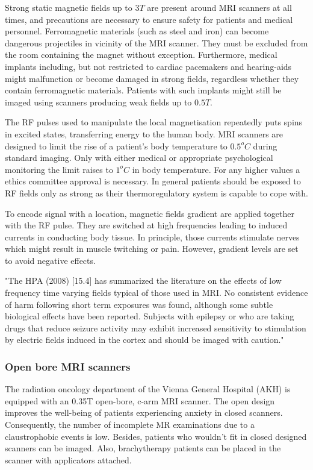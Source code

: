 Strong static magnetic fields up to $3T$ are present around MRI scanners at all times, and precautions are necessary to ensure safety for patients and medical personnel.
Ferromagnetic materials (such as steel and iron) can become dangerous projectiles in vicinity of the MRI scanner. They must be excluded from the room containing the magnet without exception.
Furthermore, medical implants including, but not restricted to cardiac pacemakers and hearing-aids might malfunction or become damaged in strong fields, regardless whether they contain ferromagnetic materials.
Patients with such implants might still be imaged using scanners producing weak fields up to $0.5T$.

The RF pulses used to manipulate the local magnetisation repeatedly puts spins in excited states, transferring energy to the human body. MRI scanners are designed to limit the rise of a patient's body temperature to $0.5^oC$ during standard imaging. Only with either medical or appropriate psychological monitoring the limit raises to $1^oC$ in body temperature. For any higher values a ethics committee approval is necessary.
In general patients should be exposed to RF fields only as strong as their thermoregulatory system is capable to cope with.

To encode signal with a location, magnetic fields gradient are applied together with the RF pulse.
They are switched at high frequencies leading to induced currents in conducting body tissue.
In principle, those currents stimulate nerves which might result in muscle twitching or pain.
However, gradient levels are set to avoid negative effects.

"The HPA (2008) [15.4] has summarized the literature on the effects of
low frequency time varying fields typical of those used in MRI. No consistent
evidence of harm following short term exposures was found, although some subtle
biological effects have been reported. Subjects with epilepsy or who are taking
drugs that reduce seizure activity may exhibit increased sensitivity to stimulation
by electric fields induced in the cortex and should be imaged with caution."


\subsubsection{Open bore MRI scanners}
The radiation oncology department of the Vienna General Hospital (AKH) is equipped with an 0.35T open-bore, c-arm MRI scanner.
The open design improves the well-being of patients experiencing anxiety in closed scanners.
Consequently, the number of incomplete MR examinations due to a claustrophobic events is low. \cite{Enders2011a, Bangard2007}
Besides, patients who wouldn't fit in closed designed scanners can be imaged.
Also, brachytherapy patients can be placed in the scanner with applicators attached.

